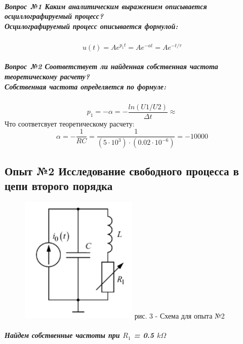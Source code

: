 \documentclass[a4paper,12pt]{report}
\begin{document}
\begin{flushleft}
  \subparagraph*{Вопрос №1 Каким аналитическим выражением описывается осциллографируемый процесс?\\ Осцилографируемый процесс описывается формулой:}
  \[ u(t) = Ae^{p_1t} = Ae^{-at} = Ae^{-t/\tau} \]
  \subparagraph*{Вопрос №2 Соответствует ли найденная собственная частота
  теоретическому расчету?\\ Собственная частота определяется по формуле:}
  \[ p_1 = - \alpha = -\frac{ln(U1/U2)}{\Delta t} \approx \]
  Что соответсвует теоретическому расчету:
  \[ \alpha = - \frac{1}{RC} = \frac{1}{(5\cdot 10^{3})\cdot (0.02\cdot 10^{-6})} = -10000 \]

    \newpage

	\item\subsection*{Опыт №2  Исследование свободного процесса в цепи второго порядка}
	\item
  \begin{figure}[h!]
    \includegraphics[width=0.5\textwidth]{image2.png}
    \label{ris:image3}
    рис. 3 - Схема для опыта №2 
\end{figure}
\newpage
  
\subparagraph*{Найдем собственные частоты при $R_1$ = 0.5 $k\Omega$}


\end{flushleft}
\end{document}
